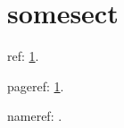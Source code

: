 \documentclass{ltugboat}
\begin{document}
\section{somesect}\label{testA}

ref: \ref{testA}.

pageref: \ref{testA}.

nameref: .
\end{document}
